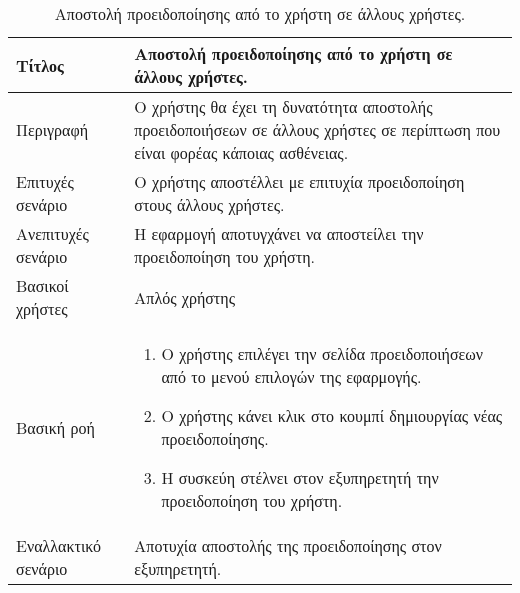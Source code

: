 \begin{table}[h]
 \caption{Αποστολή προειδοποίησης από το χρήστη σε άλλους χρήστες.}
\begin{center}
\begin{tabular}{ | m{10em} |  m{25em} | } 
\hline
 Τίτλος & Αποστολή προειδοποίησης από το χρήστη σε άλλους χρήστες. \\ 
\hline
 Περιγραφή & Ο χρήστης θα έχει τη δυνατότητα αποστολής προειδοποιήσεων σε άλλους χρήστες σε περίπτωση που είναι φορέας κάποιας ασθένειας. \\ 
\hline
 Επιτυχές σενάριο & Ο χρήστης αποστέλλει με επιτυχία προειδοποίηση στους άλλους χρήστες.\\
\hline
 Ανεπιτυχές σενάριο  & Η εφαρμογή αποτυγχάνει να αποστείλει την προειδοποίηση του χρήστη. \\ 
\hline
 Βασικοί χρήστες  & Απλός χρήστης \\ 
\hline
 Βασική ροή  & 
\begin{enumerate}
\item Ο χρήστης επιλέγει την σελίδα προειδοποιήσεων από το μενού επιλογών της εφαρμογής.
\item Ο χρήστης κάνει κλικ στο κουμπί δημιουργίας νέας προειδοποίησης.
\item Η συσκεύη στέλνει στον εξυπηρετητή την προειδοποίηση του χρήστη.
\end{enumerate}
 \\ 
\hline
 Εναλλακτικό σενάριο  & Αποτυχία αποστολής της προειδοποίησης στον εξυπηρετητή.\\ 
\hline
\end{tabular}
\end{center}
\end{table}


